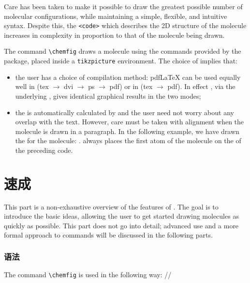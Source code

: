 \documentclass[10pt]{article}
\begin{document}
Care has been taken to make it possible to draw the greatest possible number of molecular configurations, while maintaining a simple, flexible, and intuitive syntax. Despite this, the \verb-<code>- which describes the 2D structure of the molecule increases in complexity in proportion to that of the molecule being drawn.

The command \verb|\chemfig| draws a molecule using the commands provided by the \TIKZ{} package, placed inside a \verb|tikzpicture| environment. The choice of \TIKZ implies that:
\begin{itemize}
\item the user has a choice of compilation method: pdf\LaTeX{} can be used equally well in  (tex $\longrightarrow$ dvi $\longrightarrow$ ps $\longrightarrow$ pdf) or in  (tex $\longrightarrow$ pdf). In effect \TIKZ, via the underlying , gives identical graphical results in the two modes;
\item the  is automatically calculated by \TIKZ and the user need not worry about any overlap with the text. However, care must be taken with alignment when the molecule is drawn in a paragraph. In the following example, we have drawn the  for the molecule: { }. \CF always places the first atom of the molecule on the  of the preceding code.
\end{itemize}
\newpage

\part{\protect\CF 速成}
This part is a non-exhaustive overview of the features of \CF. The goal is to introduce the basic ideas, allowing the user to get started drawing molecules as quickly as possible. This part does not go into detail; advanced use and a more formal approach to \CF commands will be discussed in the following parts.

\section{语法}
The command \verb|\chemfig|\idx*{\chemfig} is used in the following way:
\centerverb//
\end{document}
